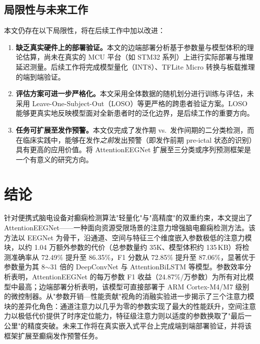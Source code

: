 \documentclass[12pt, a4paper]{article}
\begin{document}
\subsection{局限性与未来工作}

本文仍存在以下局限性，将在后续工作中加以改进：

\begin{enumerate}[label=(\arabic*), leftmargin=2.2em]
\item \textbf{缺乏真实硬件上的部署验证。}\;本文的边端部署分析基于参数量与模型体积的理论估算，尚未在真实的 MCU 平台（如 STM32 系列）上进行实际部署与推理延迟测量。后续工作将完成模型量化（INT8）\cite{ref_han2016}、TFLite Micro 转换与板载推理的端到端验证。
\item \textbf{评估方案可进一步严格化。}\;本文采用全体数据的随机划分进行训练与评估，未采用 Leave-One-Subject-Out（LOSO）等更严格的跨患者验证方案\cite{ref_ali2024}。LOSO 能够更真实地反映模型面对全新患者时的泛化边界，是后续工作的重要方向。
\item \textbf{任务可扩展至发作预警。}\;本文仅完成了发作期 vs.~发作间期的二分类检测，而在临床实践中，能够在发作\emph{之前}发出预警（即发作前期 pre-ictal 状态的识别）具有更高的应用价值\cite{ref_beniczky2024}。将 AttentionEEGNet 扩展至三分类或序列预测框架是一个有意义的研究方向。
\end{enumerate}

\section{结论}

针对便携式脑电设备对癫痫检测算法"轻量化"与"高精度"的双重约束，本文提出了 AttentionEEGNet——一种面向资源受限场景的注意力增强脑电癫痫检测方法。该方法以 EEGNet 为骨干，沿通道、空间与特征三个维度嵌入参数极低的注意力模块，以约 1.04 万额外参数的代价（总参数量约 35K、模型体积约 135\,KB）将检测准确率从 72.49\% 提升至 86.35\%，F1 分数从 72.85\% 提升至 87.06\%，显著优于参数量为其 8$\sim$31 倍的 DeepConvNet 与 AttentionBiLSTM 等模型。参数效率分析表明，AttentionEEGNet 的每万参数 F1 收益（24.87\%/万参数）为所有对比模型中最高；边端部署分析表明，该模型可直接部署于 ARM Cortex-M4/M7 级别的微控制器。从"参数开销—性能贡献"视角的消融实验进一步揭示了三个注意力模块的差异化角色：通道注意力以几乎为零的参数实现了最大的性能跃升，空间注意力以极低代价提供了时序定位能力，特征级注意力则以适度的参数换取了"最后一公里"的精度突破。未来工作将在真实嵌入式平台上完成端到端部署验证，并将该框架扩展至癫痫发作预警任务。
\end{document}
